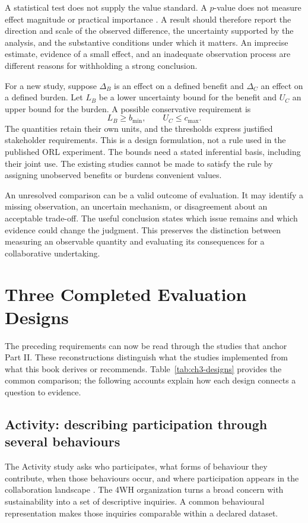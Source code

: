 A statistical test does not supply the value standard. A \(p\)-value does not measure effect magnitude or practical importance \citep{wasserstein2016}. A result should therefore report the direction and scale of the observed difference, the uncertainty supported by the analysis, and the substantive conditions under which it matters. An imprecise estimate, evidence of a small effect, and an inadequate observation process are different reasons for withholding a strong conclusion.

For a new study, suppose \(\Delta_B\) is an effect on a defined benefit and \(\Delta_C\) an effect on a defined burden. Let \(L_B\) be a lower uncertainty bound for the benefit and \(U_C\) an upper bound for the burden. A possible conservative requirement is
\begin{equation}
L_B\geq b_{\min},\qquad U_C\leq c_{\max}.
\label{eq:ch3-decision}
\end{equation}
The quantities retain their own units, and the thresholds express justified stakeholder requirements. This is a design formulation, not a rule used in the published ORL experiment. The bounds need a stated inferential basis, including their joint use. The existing studies cannot be made to satisfy the rule by assigning unobserved benefits or burdens convenient values.

An unresolved comparison can be a valid outcome of evaluation. It may identify a missing observation, an uncertain mechanism, or disagreement about an acceptable trade-off. The useful conclusion states which issue remains and which evidence could change the judgment. This preserves the distinction between measuring an observable quantity and evaluating its consequences for a collaborative undertaking.

\section{Three Completed Evaluation Designs}
\label{sec:ch3-designs}

The preceding requirements can now be read through the studies that anchor Part II. These reconstructions distinguish what the studies implemented from what this book derives or recommends. Table~\ref{tab:ch3-designs} provides the common comparison; the following accounts explain how each design connects a question to evidence.



\subsection{Activity: describing participation through several behaviours}
The Activity study asks who participates, what forms of behaviour they contribute, when those behaviours occur, and where participation appears in the collaboration landscape \citep{xia2022}. The 4WH organization turns a broad concern with sustainability into a set of descriptive inquiries. A common behavioural representation makes those inquiries comparable within a declared dataset.

